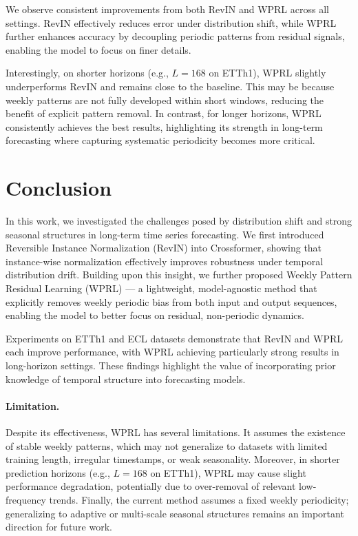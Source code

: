 \documentclass{article}
\begin{document}
We observe consistent improvements from both RevIN and WPRL across all settings. RevIN effectively reduces error under distribution shift, while WPRL further enhances accuracy by decoupling periodic patterns from residual signals, enabling the model to focus on finer details.

Interestingly, on shorter horizons (e.g., $L=168$ on ETTh1), WPRL slightly underperforms RevIN and remains close to the baseline. This may be because weekly patterns are not fully developed within short windows, reducing the benefit of explicit pattern removal. In contrast, for longer horizons, WPRL consistently achieves the best results, highlighting its strength in long-term forecasting where capturing systematic periodicity becomes more critical.

\section{Conclusion}

In this work, we investigated the challenges posed by distribution shift and strong seasonal structures in long-term time series forecasting. We first introduced Reversible Instance Normalization (RevIN) into Crossformer, showing that instance-wise normalization effectively improves robustness under temporal distribution drift. Building upon this insight, we further proposed Weekly Pattern Residual Learning (WPRL) — a lightweight, model-agnostic method that explicitly removes weekly periodic bias from both input and output sequences, enabling the model to better focus on residual, non-periodic dynamics.

Experiments on ETTh1 and ECL datasets demonstrate that RevIN and WPRL each improve performance, with WPRL achieving particularly strong results in long-horizon settings. These findings highlight the value of incorporating prior knowledge of temporal structure into forecasting models.

\paragraph{Limitation.}

Despite its effectiveness, WPRL has several limitations. It assumes the existence of stable weekly patterns, which may not generalize to datasets with limited training length, irregular timestamps, or weak seasonality. Moreover, in shorter prediction horizons (e.g., $L=168$ on ETTh1), WPRL may cause slight performance degradation, potentially due to over-removal of relevant low-frequency trends. Finally, the current method assumes a fixed weekly periodicity; generalizing to adaptive or multi-scale seasonal structures remains an important direction for future work.
\end{document}
